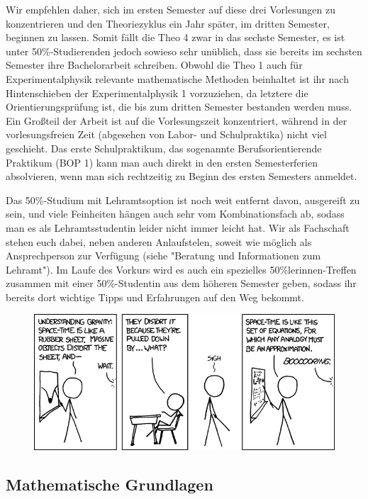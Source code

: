 Wir empfehlen daher, sich im ersten Semester auf diese drei Vorlesungen zu konzentrieren und den Theoriezyklus ein Jahr später, im dritten Semester, beginnen zu lassen. Somit fällt die Theo 4 zwar in das sechste Semester, es ist unter 50\%-Studierenden jedoch sowieso sehr unüblich, dass sie bereits im sechsten Semester ihre Bachelorarbeit schreiben. Obwohl die Theo 1 auch für Experimentalphysik relevante mathematische Methoden beinhaltet ist ihr nach Hintenschieben der Experimentalphysik 1 vorzuziehen, da letztere die Orientierungsprüfung ist, die bis zum dritten Semester bestanden werden muss. Ein Großteil der Arbeit ist auf die Vorlesungszeit konzentriert, während in der vorlesungsfreien Zeit (abgesehen von Labor- und Schulpraktika) nicht viel geschieht. Das erste Schulpraktikum, das sogenannte Berufsorientierende Praktikum (BOP 1) kann man auch direkt in den ersten Semesterferien absolvieren, wenn man sich rechtzeitig zu Beginn des ersten Semesters anmeldet.

Das 50\%-Studium mit Lehramtsoption ist noch weit entfernt davon, ausgereift zu sein, und viele Feinheiten hängen auch sehr vom Kombinationsfach ab, sodass man es als Lehramtsstudentin leider nicht immer leicht hat. Wir als Fachschaft stehen euch dabei, neben anderen Anlaufstelen, soweit wie möglich als Ansprechperson zur Verfügung (siehe "Beratung und Informationen zum Lehramt"). Im Laufe des Vorkurs wird es auch ein spezielles 50\%lerinnen-Treffen zusammen mit einer 50\%-Studentin aus dem höheren Semester geben, sodass ihr bereits dort wichtige Tipps und Erfahrungen auf den Weg bekommt. 

\begin{figure}[b]
\centering
\includegraphics[width=\textwidth]{bilder/teaching_physics.jpg}
\end{figure}


\subsection{Mathematische Grundlagen}

